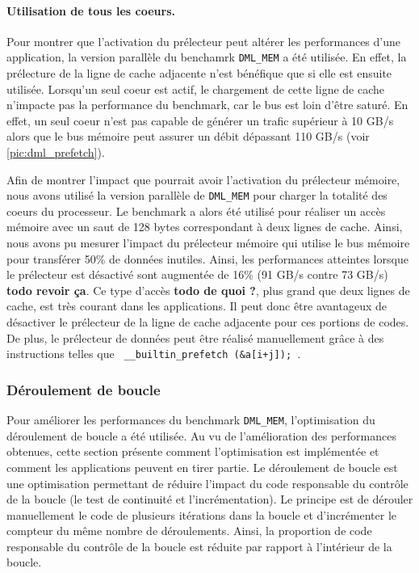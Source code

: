         
        
         
        \paragraph{Utilisation de tous les coeurs.} 
            
            Pour montrer que l'activation du prélecteur peut altérer les performances d'une application, la version parallèle du benchamrk \verb=DML_MEM= a été utilisée. En effet, la prélecture de la ligne de cache adjacente n'est bénéfique que si elle est ensuite utilisée. Lorsqu'un seul coeur est actif, le chargement de cette ligne de cache n'impacte pas la performance du benchmark, car le bus est loin d'être saturé. En effet, un seul coeur n'est pas capable de générer un trafic supérieur à 10 GB/s alors que le bus mémoire peut assurer un débit dépassant 110 GB/s (voir \autoref{pic:dml_prefetch}). 
            
            Afin de montrer l'impact que pourrait avoir l'activation du prélecteur mémoire, nous avons utilisé la version parallèle de \verb=DML_MEM= pour charger la totalité des coeurs du processeur. Le benchmark a alors été utilisé pour réaliser un accès mémoire avec un saut de 128 bytes correspondant à deux lignes de cache. Ainsi, nous avons pu mesurer l'impact du prélecteur mémoire qui utilise le bus mémoire pour transférer 50\% de données inutiles. Ainsi, les performances atteintes lorsque le prélecteur est désactivé sont augmentée de 16\% (91 GB/s contre 73 GB/s) \textbf{todo revoir ça}. Ce type d'accès \textbf{todo de quoi ?}, plus grand que deux lignes de cache, est très courant dans les applications. Il peut donc être avantageux de désactiver le prélecteur de la ligne de cache adjacente pour ces portions de codes. De plus, le prélecteur de données peut être réalisé manuellement grâce à des instructions telles que \verb| __builtin_prefetch (&a[i+j]); |.





    
    \subsubsection{Déroulement de boucle} \label{sec:dml_unroll}
    Pour améliorer les performances du benchmark \verb=DML_MEM=, l'optimisation du déroulement de boucle a été utilisée. Au vu de l'amélioration des performances obtenues, cette section présente comment l'optimisation est implémentée et comment les applications peuvent en tirer partie. 
    Le déroulement de boucle est une optimisation permettant de réduire l'impact du code responsable du contrôle de la boucle (le test de continuité et l'incrémentation). Le principe est de dérouler manuellement le code de plusieurs itérations dans la boucle et d'incrémenter le compteur du même nombre de déroulements. Ainsi, la proportion de code responsable du contrôle de la boucle est réduite par rapport à l'intérieur de la boucle. 
    
